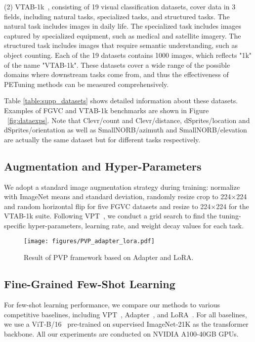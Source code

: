 \documentclass[10pt,journal,letterpaper,compsoc]{IEEEtran}
\begin{document}
(2) VTAB-1k~\cite{VTAB}, consisting of 19 visual classification datasets, cover data in 3 fields, including natural tasks, specialized tasks, and structured tasks. The natural task includes images in daily life. The specialized task includes images captured by specialized equipment, such as medical and satellite imagery. The structured task includes images that require semantic understanding, such as object counting. Each of the 19 datasets contains 1000 images, which reflects "1k" of the name "VTAB-1k". These datasets cover a wide range of the possible domains where downstream tasks come from, and thus the effectiveness of PETuning methods can be measured comprehensively.

Table \ref{table:supp_datasets} shows detailed information about these datasets. Examples of FGVC and VTAB-1k benchmarks are shown in Figure ~\ref{fig:dataexps}. Note that Clevr/count and Clevr/distance, dSprites/location and dSprites/orientation as well as SmallNORB/azimuth and SmallNORB/elevation are actually the same dataset but for different tasks respectively.

\subsection{Augmentation and Hyper-Parameters}
We adopt a standard image augmentation strategy during training: normalize with ImageNet means and standard deviation, randomly resize crop to 224$\times$224 and random horizontal flip for five FGVC datasets and resize to 224$\times$224 for the VTAB-1k suite. 
Following VPT~\cite{vpt}, we conduct a grid search to find the tuning-specific hyper-parameters, learning rate, and weight decay values for each task.


\begin{figure*}[h]
    \centering
    \texttt{[image: figures/PVP\_adapter\_lora.pdf]}
    \caption{Result of PVP framework based on Adapter and LoRA.}
    \label{fig:other_prompt}
\end{figure*}



\subsection{Fine-Grained Few-Shot Learning}
For few-shot learning performance, we compare our methods to various competitive baselines, including VPT~\cite{vpt}, Adapter~\cite{adapter}, and LoRA~\cite{Lora}. For all baselines, we use a ViT-B/16~\cite{vit} pre-trained on supervised ImageNet-21K as the transformer backbone. All our experiments are conducted on NVIDIA A100-40GB GPUs.
\end{document}
